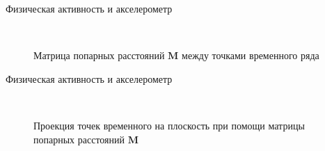 \documentclass{beamer}
\begin{document}
\begin{frame}{Физическая активность и акселерометр}
	\begin{figure}[h!t]\center
		\\
		\caption{Матрица попарных расстояний $\textbf{M}$ между точками временного ряда}
	\end{figure}
\end{frame}
\begin{frame}{Физическая активность и акселерометр}
	\begin{figure}[h!t]\center
		\\
		\caption{Проекция точек временного на плоскость при помощи матрицы попарных расстояний $\textbf{M}$}
	\end{figure}
\end{frame}
\end{document}
